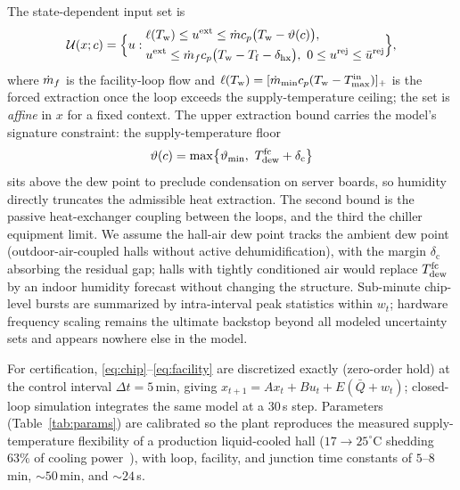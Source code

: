 The state-dependent input set is
\begin{equation}
\mathcal{U}(x;c)=\Bigl\{u:
\begin{aligned}
&\ell(\Tw) \le \uext \le \mdot c_p\bigl(\Tw-\vartheta(c)\bigr),\\
&\uext \le \mdot[f] c_p\bigl(\Tw-\Tf-\delta_{\mathrm{hx}}\bigr),\
0 \le \urej \le \bar u^{\mathrm{rej}}
\end{aligned}
\Bigr\},
\label{eq:Ux}
\end{equation}
where $\mdot[f]$ is the facility-loop flow and
$\ell(\Tw)=[\mdot_{\min} c_p(\Tw - T^{\mathrm{in}}_{\max})]_+$ is the forced
extraction once the loop exceeds the supply-temperature ceiling; the set is
\emph{affine} in $x$ for a fixed context. The upper extraction bound carries
the model's signature constraint: the supply-temperature floor
\begin{equation}
\vartheta(c) = \max\bigl\{\vartheta_{\min},\ \Tdew^{\mathrm{fc}}
 + \delta_{\mathrm{c}}\bigr\}
\label{eq:floor}
\end{equation}
sits above the dew point to preclude condensation on server boards, so
humidity directly truncates the admissible heat extraction. The second bound
is the passive heat-exchanger coupling between the loops, and the third the
chiller equipment limit. We assume the hall-air dew point tracks the ambient
dew point (outdoor-air-coupled halls without active dehumidification), with
the margin $\delta_{\mathrm{c}}$ absorbing the residual gap; halls with
tightly conditioned air would replace $\Tdew^{\mathrm{fc}}$ by an indoor
humidity forecast without changing the structure. Sub-minute chip-level bursts are summarized by
intra-interval peak statistics within $w_t$; hardware frequency scaling
remains the ultimate backstop beyond all modeled uncertainty sets and appears
nowhere else in the model.

For certification, \eqref{eq:chip}--\eqref{eq:facility} are discretized
exactly (zero-order hold) at the control interval $\Delta t=5$\,min, giving
$x_{t+1}=Ax_t+Bu_t+E(\bar Q + w_t)$; closed-loop simulation integrates the
same model at a $30$\,s step. Parameters (Table~\ref{tab:params}) are
calibrated so the plant reproduces the measured supply-temperature
flexibility of a production liquid-cooled hall ($17\to 25^\circ$C shedding
$63\%$ of cooling power~\cite{gheni2026liquid}), with loop, facility, and
junction time constants of $5$--$8$\,min, ${\sim}50$\,min, and ${\sim}24$\,s.

